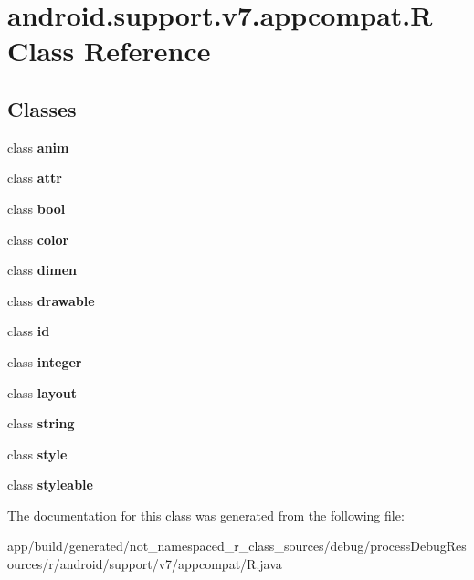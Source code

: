 \hypertarget{classandroid_1_1support_1_1v7_1_1appcompat_1_1_r}{}\section{android.\+support.\+v7.\+appcompat.\+R Class Reference}
\label{classandroid_1_1support_1_1v7_1_1appcompat_1_1_r}
\subsection*{Classes}
\begin{DoxyCompactItemize}
\item 
class {\bfseries anim}
\item 
class {\bfseries attr}
\item 
class {\bfseries bool}
\item 
class {\bfseries color}
\item 
class {\bfseries dimen}
\item 
class {\bfseries drawable}
\item 
class {\bfseries id}
\item 
class {\bfseries integer}
\item 
class {\bfseries layout}
\item 
class {\bfseries string}
\item 
class {\bfseries style}
\item 
class {\bfseries styleable}
\end{DoxyCompactItemize}


The documentation for this class was generated from the following file\+:\begin{DoxyCompactItemize}
\item 
app/build/generated/not\+\_\+namespaced\+\_\+r\+\_\+class\+\_\+sources/debug/process\+Debug\+Resources/r/android/support/v7/appcompat/R.\+java\end{DoxyCompactItemize}
